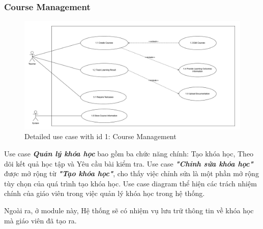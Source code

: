 \subsubsection{Course Management}
\begin{figure}[H]
    \centering
    \includegraphics[scale=0.4]{Images/Usecase/usecase-Course Management.drawio.png}
    \caption{Detailed use case with id 1: Course Management}
    \label{fig:enter-label}
\end{figure}
\quad Use case \textbf{\textit{Quản lý khóa học}} bao gồm ba chức năng chính: Tạo khóa học, Theo dõi kết quả học tập và Yêu cầu bài kiểm tra. Use case  \textbf{\textit{"Chỉnh sửa khóa học"}} được mở rộng từ  \textbf{\textit{"Tạo khóa học"}}, cho thấy việc chỉnh sửa là một phần mở rộng tùy chọn của quá trình tạo khóa học. Use case diagram thể hiện các trách nhiệm chính của giáo viên trong việc quản lý khóa học trong hệ thống.
\par Ngoài ra, ở module này, Hệ thống sẽ có nhiệm vụ lưu trữ thông tin về khóa học mà giáo viên đã tạo ra. 
